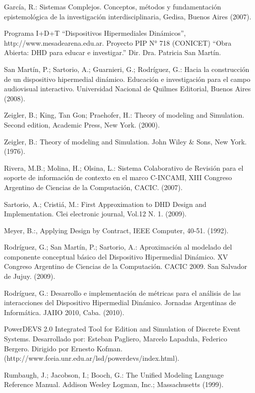\begin{thebibliography}{1}
{\bibitem{}
García, R.: Sistemas Complejos. Conceptos, métodos y fundamentación
epistemológica de la investigación interdisciplinaria, Gedisa, Buenos
Aires (2007).

\bibitem{}
Programa I+D+T “Dispositivos Hipermediales Dinámicos”,
http://www.mesadearena.edu.ar. Proyecto PIP N° 718 (CONICET) “Obra Abierta: DHD
para educar e investigar.” Dir. Dra. Patricia San Martín.


\bibitem{}
San Martín, P.; Sartorio, A.; Guarnieri, G.; Rodríguez, G.: Hacia
la construcción de un dispositivo hipermedial dinámico. Educación e
investigación para el campo audiovisual interactivo. Universidad Nacional de
Quilmes Editorial, Buenos Aires (2008).


\bibitem{}
Zeigler, B.; King, Tan Gon; Praehofer, H.: Theory of modeling and
Simulation. Second edition, Academic Press, New York. (2000).


\bibitem{}
Zeigler, B.: Theory of modeling and Simulation. John Wiley & Sons, New
York. (1976).

\bibitem{}
Rivera, M.B.; Molina, H.; Olsina, L.: Sistema Colaborativo de
Revisión para el soporte de información de contexto en el marco C-INCAMI, XIII
Congreso Argentino de Ciencias de la Computación, CACIC. (2007).

\bibitem{}
Sartorio, A.; Cristiá, M.: First Approximation to DHD Design and
Implementation. Clei electronic journal, Vol.12 N. 1. (2009).

\bibitem{}
Meyer, B.:, Applying Design by Contract, IEEE Computer, 40-51. (1992).

\bibitem{}
Rodríguez, G.; San Martín, P.; Sartorio, A.: Aproximación al modelado
del componente conceptual básico del Dispositivo Hipermedial Dinámico.  XV
Congreso Argentino de Ciencias de la Computación. CACIC 2009. San Salvador de
Jujuy. (2009).


\bibitem{}
Rodríguez, G.: Desarrollo e implementación de métricas para el
análisis de las interacciones del Dispositivo Hipermedial Dinámico. Jornadas
Argentinas de Informática. JAIIO 2010, Caba. (2010).

\bibitem{}
PowerDEVS 2.0 Integrated Tool for Edition and Simulation of Discrete
Event Systems. Desarrollado por: Esteban Pagliero, Marcelo Lapadula, Federico
Bergero. Dirigido por Ernesto
Kofman. (http://www.fceia.unr.edu.ar/lsd/powerdevs/index.html).

\bibitem{} 
Rumbaugh, J.; Jacobson, I.; Booch, G.: The Unified Modeling Language
Reference Manual. Addison Wesley Logman, Inc.; Massachusetts (1999).


}
\end{thebibliography}
